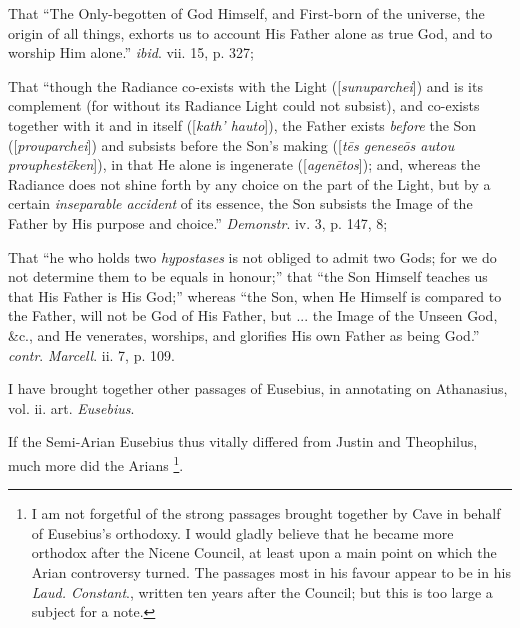That ``The Only-begotten of God Himself, and First-born of the
universe, the origin of all things, exhorts us to account His Father
alone as true God, and to worship Him alone.'' \emph{ibid}. vii.
15, p. 327;

That ``though the Radiance co-exists with the Light ([\emph{sunuparchei}])
and is its complement (for without its Radiance Light could not
subsist), and co-exists together with it and in itself ([\emph{kath' hauto}]),
the Father exists \emph{before} the Son ([\emph{prouparchei}]) and
subsists before the Son's making ([\emph{t\={e}s genese\={o}s autou
prouphest\={e}ken}]), in that He alone is ingenerate ([\emph{agen\={e}tos}]);
and, whereas the Radiance does not shine forth by any choice on the
part of the Light, but by a certain \emph{inseparable accident} of its
essence, the Son subsists the Image of the Father by His purpose and
choice.'' \emph{Demonstr}. iv. 3, p. 147, 8;

That ``he who holds two \emph{hypostases} is not obliged to
admit two Gods; for we do not determine them to be equals in
honour;'' that ``the Son Himself teaches us that His Father is
His God;'' whereas ``the Son, when He Himself is compared to
the Father, will not be God of His Father, but ... the Image of the
Unseen God, \&c., and He venerates, worships, and glorifies His own
Father as being God.'' \emph{contr}. \emph{Marcell}. ii. 7, p.
109.

I have brought together other passages of Eusebius, in annotating
on Athanasius, vol. ii. art. \emph{Eusebius}.

If the Semi-Arian Eusebius thus vitally differed from Justin
and Theophilus, much more did the Arians \footnote{I am not forgetful of the strong passages brought together by Cave
in behalf of Eusebius's orthodoxy. I would gladly believe that he
became more orthodox after the Nicene Council, at least upon a main
point on which the Arian controversy turned. The passages most in his
favour appear to be in his \emph{Laud. Constant}., written ten years
after the Council; but this is too large a subject for a note.}.

